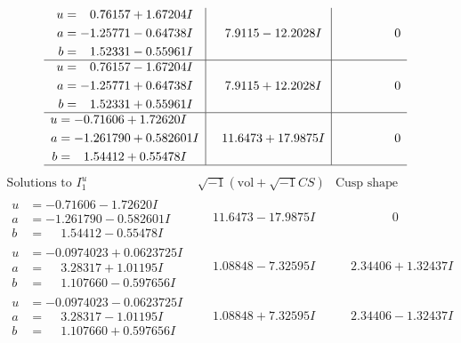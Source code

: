 \documentclass[1p]{elsarticle_modified}
\theoremstyle{definition}
\newcommand{\I}{\sqrt{-1}}
\begin{document}
$$\begin{array}{c|c|c}
\begin{aligned}
u &= \phantom{-}0.76157 + 1.67204 I \\
a &= -1.25771 - 0.64738 I \\
b &= \phantom{-}1.52331 - 0.55961 I\end{aligned}
 & \phantom{-}7.9115 - 12.2028 I & \phantom{-0.000000 } 0 \\ \hline\begin{aligned}
u &= \phantom{-}0.76157 - 1.67204 I \\
a &= -1.25771 + 0.64738 I \\
b &= \phantom{-}1.52331 + 0.55961 I\end{aligned}
 & \phantom{-}7.9115 + 12.2028 I & \phantom{-0.000000 } 0 \\ \hline\begin{aligned}
u &= -0.71606 + 1.72620 I \\
a &= -1.261790 + 0.582601 I \\
b &= \phantom{-}1.54412 + 0.55478 I\end{aligned}
 & \phantom{-}11.6473 + 17.9875 I & \phantom{-0.000000 } 0\\
 \hline 
 \end{array}$$\newpage$$\begin{array}{c|c|c}  
\text{Solutions to }I^u_{1}& \I (\text{vol} + \sqrt{-1}CS) & \text{Cusp shape}\\
 \hline 
\begin{aligned}
u &= -0.71606 - 1.72620 I \\
a &= -1.261790 - 0.582601 I \\
b &= \phantom{-}1.54412 - 0.55478 I\end{aligned}
 & \phantom{-}11.6473 - 17.9875 I & \phantom{-0.000000 } 0 \\ \hline\begin{aligned}
u &= -0.0974023 + 0.0623725 I \\
a &= \phantom{-}3.28317 + 1.01195 I \\
b &= \phantom{-}1.107660 - 0.597656 I\end{aligned}
 & \phantom{-}1.08848 - 7.32595 I & \phantom{-}2.34406 + 1.32437 I \\ \hline\begin{aligned}
u &= -0.0974023 - 0.0623725 I \\
a &= \phantom{-}3.28317 - 1.01195 I \\
b &= \phantom{-}1.107660 + 0.597656 I\end{aligned}
 & \phantom{-}1.08848 + 7.32595 I & \phantom{-}2.34406 - 1.32437 I \\ \hline\begin{aligned}

\end{aligned}
\end{array}$$
\end{document}
